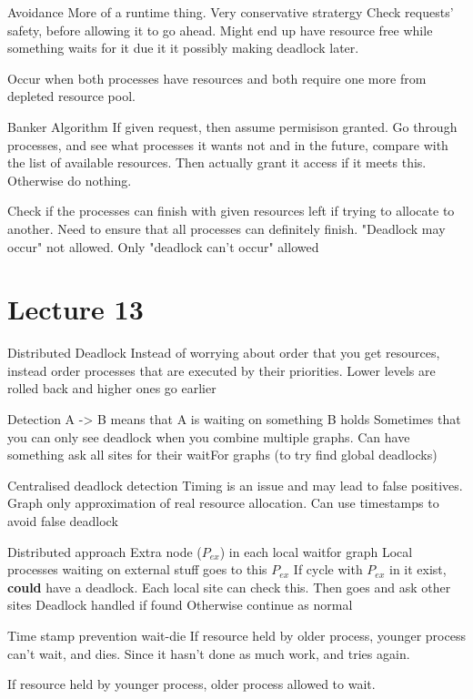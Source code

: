 \documentclass{article}
\begin{document}
		Avoidance
			More of a runtime thing. Very conservative stratergy
			Check requests' safety, before allowing it to go ahead.
			Might end up have resource free while something waits for it due it it possibly making deadlock later.

			Occur when both processes have resources and both require one more from depleted resource pool.

		Banker Algorithm
			If given request, then assume permisison granted.
			Go through processes, and see what processes it wants not and in the future, compare with the list of available resources.
			Then actually grant it access if it meets this. Otherwise do nothing.

			Check if the processes can finish with given resources left if trying to allocate to another. 
			Need to ensure that all processes can definitely finish.
			"Deadlock may occur" not allowed. Only "deadlock can't occur" allowed

\section{Lecture 13}
	Distributed Deadlock
		Instead of worrying about order that you get resources, instead order processes that are executed by their priorities. 
		Lower levels are rolled back and higher ones go earlier

		Detection
			A -> B	means that A is waiting on something B holds
			Sometimes that you can only see deadlock when you combine multiple graphs.
			Can have something ask all sites for their waitFor graphs (to try find global deadlocks)

			Centralised deadlock detection
				Timing is an issue and may lead to false positives.
				Graph only approximation of real resource allocation.
				Can use timestamps to avoid false deadlock

			Distributed approach
				Extra node ($P_{ex}$) in each local waitfor graph
				Local processes waiting on external stuff goes to this $P_{ex}$
				If cycle with $P_{ex}$ in it exist, \textbf{could} have a deadlock. Each local site can check this.
					Then goes and ask other sites
					Deadlock handled if found
					Otherwise continue as normal

	Time stamp prevention
		wait-die
			If resource held by older process, younger process can't wait, and dies. Since it hasn't done as much work, and tries again.

			If resource held by younger process, older process allowed to wait.
\end{document}
